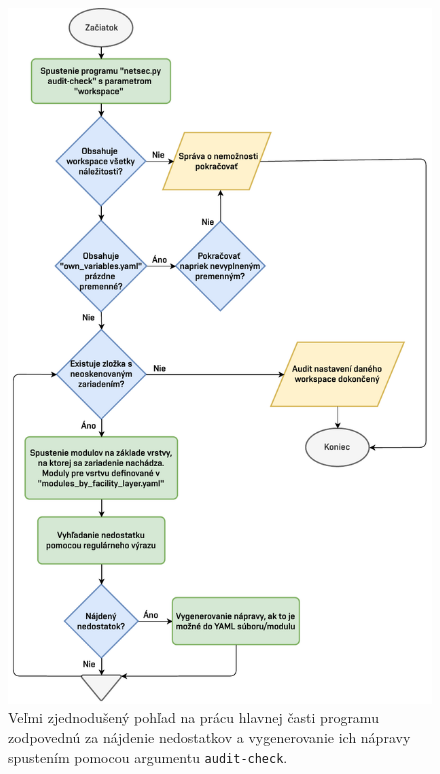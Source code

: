 \begin{figure}[H]
	\begin{center}
		\includegraphics[scale=0.8]{obrazky/netsec_audit.pdf}
	\end{center}
	\caption[Veľmi zjednodušený pohľad na prácu hlavnej časti programu zodpovednú za nájdenie nedostatkov a vygenerovanie ich nápravy spustením pomocou argumentu \texttt{audit-check}.]{Veľmi zjednodušený pohľad na prácu hlavnej časti programu zodpovednú za nájdenie nedostatkov a vygenerovanie ich nápravy spustením pomocou argumentu \texttt{audit-check}.}
	\label{netsec_audit}
\end{figure}

